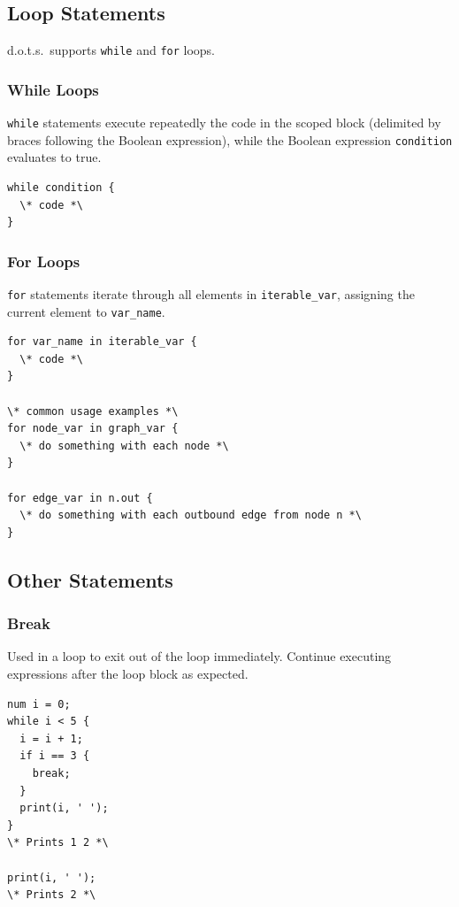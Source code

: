 \documentclass{article}
\newcommand{\pltlang}{d.o.t.s.} %
\newcommand{\code}[1]{\texttt{#1}} %
\begin{document}
\subsection{Loop Statements}
\pltlang\ supports \code{while} and \code{for} loops.

\subsubsection{While Loops}

\code{while} statements execute repeatedly the code in the scoped block (delimited by braces following the Boolean expression), while the Boolean expression \code{condition} evaluates to true. 

\begin{lstlisting}[language=pltLang, label=lst:while-loop]
while condition {
  \* code *\
}

\end{lstlisting}

\subsubsection{For Loops}
\code{for} statements iterate through all elements in \code{iterable\_var}, assigning the current element to \code{var\_name}. 

\begin{lstlisting}[language=pltLang, label=lst:for-loop]
for var_name in iterable_var {
  \* code *\
}

\* common usage examples *\
for node_var in graph_var {
  \* do something with each node *\
}

for edge_var in n.out {
  \* do something with each outbound edge from node n *\
}

\end{lstlisting}

\subsection{Other Statements}

\subsubsection{Break}
Used in a loop to exit out of the loop immediately. Continue executing expressions after the loop block as expected.

\begin{lstlisting}[language=pltlang, label=lst:break-statement]
num i = 0;
while i < 5 {
  i = i + 1;
  if i == 3 {
    break;
  }
  print(i, ' ');
}
\* Prints 1 2 *\

print(i, ' ');
\* Prints 2 *\

\end{lstlisting}
\end{document}
